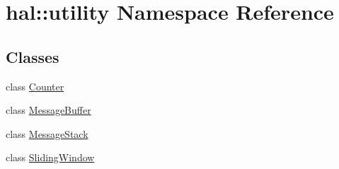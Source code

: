 \hypertarget{namespacehal_1_1utility}{}\section{hal\+:\+:utility Namespace Reference}
\label{namespacehal_1_1utility}
\subsection*{Classes}
\begin{DoxyCompactItemize}
\item 
class \hyperlink{classhal_1_1utility_1_1_counter}{Counter}
\item 
class \hyperlink{classhal_1_1utility_1_1_message_buffer}{Message\+Buffer}
\item 
class \hyperlink{classhal_1_1utility_1_1_message_stack}{Message\+Stack}
\item 
class \hyperlink{classhal_1_1utility_1_1_sliding_window}{Sliding\+Window}
\end{DoxyCompactItemize}
